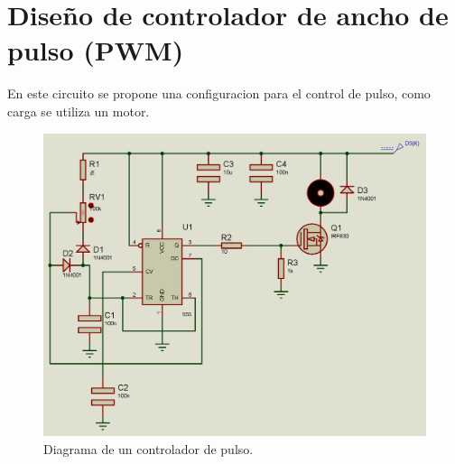 \documentclass[letterpaper]{article}
\begin{document}
    \section{Diseño de controlador de ancho de pulso (PWM)}
    En este circuito se propone una configuracion para el control de pulso, como carga se utiliza un motor.
    \newpage
    \begin{figure}
        \centering
        \includegraphics[scale=0.3]{IMG/PMW.png}
        \caption{Diagrama de un controlador de pulso.}
        \label{fig:diag}
    \end{figure}
\end{document}
